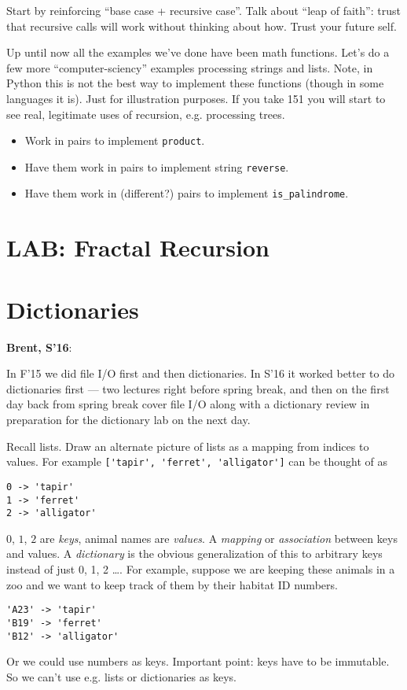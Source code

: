 \documentclass{article}
\newenvironment{reflect}[1]
{
  \noindent
  \begin{lrbox}{\reflectbox}
    \begin{minipage}[t]{\textwidth}
      \textbf{#1}:
}{
    \end{minipage}
  \end{lrbox}
  \fbox{\usebox{\reflectbox}}
}
\begin{document}
Start by reinforcing ``base case + recursive case''.  Talk about
``leap of faith'': trust that recursive calls will work without
thinking about how.  Trust your future self.

Up until now all the examples we've done have been math functions.
Let's do a few more ``computer-sciency'' examples processing strings
and lists.  Note, in Python this is not the best way to implement
these functions (though in some languages it is).  Just for
illustration purposes.  If you take 151 you will start to see real,
legitimate uses of recursion, e.g. processing trees.

\begin{itemize}
\item Work in pairs to implement \verb|product|.
\item Have them work in pairs to implement string \verb|reverse|.
\item Have them work in (different?) pairs to implement \verb|is_palindrome|.
\end{itemize}

\section*{LAB: Fractal Recursion}

\newpage

\section{Dictionaries}

\begin{reflect}{Brent, S'16}
  In F'15 we did file I/O first and then dictionaries.  In S'16 it
  worked better to do dictionaries first --- two lectures right before
  spring break, and then on the first day back from spring break cover
  file I/O along with a dictionary review in preparation for the
  dictionary lab on the next day.
\end{reflect}

Recall lists.  Draw an alternate picture of lists as a mapping from
indices to values. For example \verb|['tapir', 'ferret', 'alligator']|
can be thought of as
\begin{verbatim}
0 -> 'tapir'
1 -> 'ferret'
2 -> 'alligator'
\end{verbatim}
$0$, $1$, $2$ are \emph{keys}, animal names are \emph{values}.  A
\emph{mapping} or \emph{association} between keys and values.  A
\emph{dictionary} is the obvious generalization of this to arbitrary
keys instead of just 0, 1, 2 \dots.  For example, suppose we are
keeping these animals in a zoo and we want to keep track of them by
their habitat ID numbers.
\begin{verbatim}
'A23' -> 'tapir'
'B19' -> 'ferret'
'B12' -> 'alligator'
\end{verbatim}
Or we could use numbers as keys.  Important point: keys have to be
immutable.  So we can't use e.g. lists or dictionaries as keys.
\end{document}
